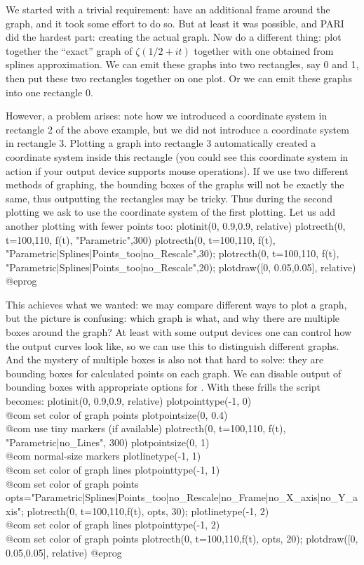 We started with a trivial requirement: have an additional frame around
the graph, and it took some effort to do so.  But at least it was possible,
and PARI did the hardest part: creating the actual graph.
Now do a different thing: plot together the ``exact'' graph of
$\zeta({1/2}+it)$ together with one obtained from splines approximation.
We can emit these graphs into two rectangles, say 0 and 1, then put these
two rectangles together on one plot.  Or we can emit these graphs into one
rectangle 0.

However, a problem arises: note how we
introduced a coordinate system in rectangle 2 of the above example, but we
did not introduce a coordinate system in rectangle 3.  Plotting a
graph into rectangle 3 automatically created a coordinate system
inside this rectangle (you could see this coordinate system in action
if your output device supports mouse operations).  If we use two different
methods of graphing, the bounding boxes of the graphs will not be exactly
the same, thus outputting the rectangles may be tricky.  Thus during
the second plotting we ask  to use the coordinate system of
the first plotting.  Let us add another plotting with fewer
points too:
\bprog
plotinit(0, 0.9,0.9, relative)
plotrecth(0, t=100,110, f(t), "Parametric",300)
plotrecth(0, t=100,110, f(t), "Parametric|Splines|Points_too|no_Rescale",30);
plotrecth(0, t=100,110, f(t), "Parametric|Splines|Points_too|no_Rescale",20);
plotdraw([0, 0.05,0.05], relative)
@eprog

This achieves what we wanted: we may compare different ways to plot a graph,
but the picture is confusing: which graph is what, and why there are multiple
boxes around the graph?  At least with some output devices one can control
how the output curves look like, so we can use this to distinguish different
graphs.  And the mystery of multiple boxes is also not that hard to solve:
they are bounding boxes for calculated points on each graph.  We can disable
output of bounding boxes with appropriate options for .
With these frills the script becomes:
\bprog
plotinit(0, 0.9,0.9, relative)
plotpointtype(-1, 0)                \\@com set color of graph points
plotpointsize(0, 0.4)               \\@com use tiny markers (if available)
plotrecth(0, t=100,110, f(t), "Parametric|no_Lines", 300)
plotpointsize(0, 1)                 \\@com normal-size markers
plotlinetype(-1, 1)                 \\@com set color of graph lines
plotpointtype(-1, 1)                \\@com set color of graph points
opts="Parametric|Splines|Points_too|no_Rescale|no_Frame|no_X_axis|no_Y_axis";
plotrecth(0, t=100,110,f(t), opts, 30);
plotlinetype(-1, 2)                 \\@com set color of graph lines
plotpointtype(-1, 2)                \\@com set color of graph points
plotrecth(0, t=100,110,f(t), opts, 20);
plotdraw([0, 0.05,0.05], relative)
@eprog

